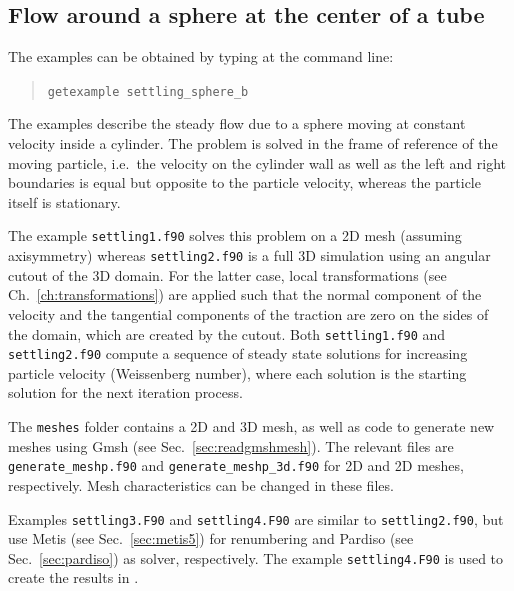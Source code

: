 \subsection{Flow around a sphere at the center of a tube}
\label{sec:settsphere}
The examples can be obtained by typing at the command line:
\begin{quote}
   \texttt{getexample settling\_sphere\_b}
\end{quote}

The examples describe the steady flow due to a sphere moving at constant velocity inside a cylinder. 
The problem is solved in the frame of reference of the moving particle, i.e.~the velocity on the
cylinder wall as well as the left and right boundaries is equal but opposite to the particle 
velocity, whereas the particle itself is stationary.

The example \texttt{settling1.f90} solves this problem on a 2D mesh (assuming axisymmetry) whereas
\texttt{settling2.f90} is a full 3D simulation using an angular cutout of the 3D domain. 
For the latter case, local transformations (see Ch.~\ref{ch:transformations}) are applied such that 
the normal component of the velocity and the tangential components of the traction are zero on 
the sides of the domain, which are created by the cutout. Both \texttt{settling1.f90} and \texttt{settling2.f90}
compute a sequence of steady state solutions for increasing particle velocity 
(Weissenberg number), where each solution is the starting solution for the next iteration process. 

The \texttt{meshes} folder contains a 2D and 3D mesh, as well as code to 
generate new meshes using Gmsh (see Sec.~\ref{sec:readgmshmesh}). 
The relevant files are \texttt{generate\_meshp.f90} and \newline
\texttt{generate\_meshp\_3d.f90} for 2D and 2D meshes, respectively. Mesh characteristics
can be changed in these files.

Examples \texttt{settling3.F90} and \texttt{settling4.F90} are similar to \texttt{settling2.f90}, 
but use Metis (see Sec.~\ref{sec:metis5}) for renumbering and Pardiso (see Sec.~\ref{sec:pardiso}) as solver, respectively.
The example \texttt{settling4.F90} is used to create the results in \cite{JaenssonHulsen2024}.
